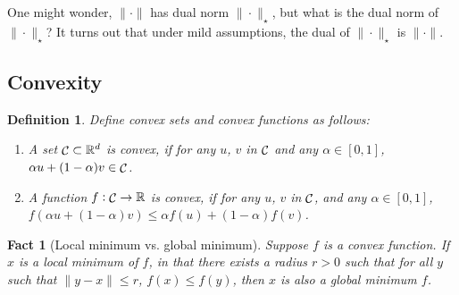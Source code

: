 \documentclass{article}
\newtheorem{example}{Example}
\newtheorem{definition}{Definition}
\newtheorem{fact}{Fact}
\DeclareMathOperator*{\ope}{{\rm op}}
\DeclareMathOperator*{\Ccal}{{\cal C}}
\newcommand{\RR}{\mathbb{R}} %
\begin{document}
One might wonder, $\| \cdot\|$ has dual norm $\| \cdot\|_\star$, but
what is the dual norm of $\| \cdot\|_\star$? It turns out that under mild assumptions, the dual of $\|\cdot \|_\star$ is $\|\cdot \|$.



\subsection{Convexity}

\begin{definition}
Define convex sets and convex functions as follows:
\begin{enumerate}
\item A set $\Ccal \subset \RR^d$ is convex, if for any $u$, $v$ in $\Ccal$ and any $\alpha \in [0,1]$,
$\alpha u + (1-\alpha) v \in \Ccal$.

\item A function $f: \Ccal \to \RR$ is convex, if for any $u$, $v$ in $\Ccal$, and any $\alpha \in [0,1]$, $f(\alpha u + (1-\alpha)v) \leq \alpha f(u) + (1-\alpha) f(v)$.
\end{enumerate}
\end{definition}

\begin{fact}[Local minimum vs. global minimum]
Suppose $f$ is a convex function. If $x$ is a local minimum of $f$, in that there exists a radius $r > 0$ such that for all $y$ such that $\| y - x\| \leq r$, $f(x) \leq f(y)$, then $x$ is also a global minimum $f$.
\end{fact}
\end{document}
